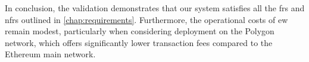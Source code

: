In conclusion, the validation demonstrates that our system satisfies all the \glspl{fr} and \glspl{nfr} outlined in \cref{chap:requirements}. Furthermore, the operational costs of \gls{ew} remain modest, particularly when considering deployment on the Polygon network, which offers significantly lower transaction fees compared to the Ethereum main network.